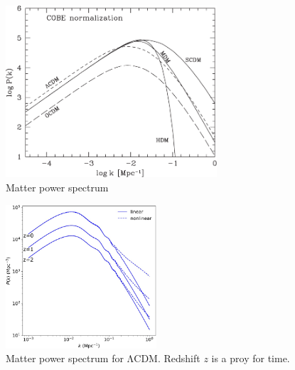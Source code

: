 \begin{figure}
	\centering
	\includegraphics[width=0.7\textwidth]{img/ch-03/k-power-spectrum.pdf}
	\caption{Matter power spectrum}
	\label{fig:k-power}
\end{figure}

\begin{figure}
	\centering
	\includegraphics[width=0.5\textwidth]{img/ch-03/lcdm-spectrum.pdf}
	\caption{Matter power spectrum for ΛCDM. Redshift $z$ is a proy for time.}
	\label{fig:power-lcdm}
\end{figure}


